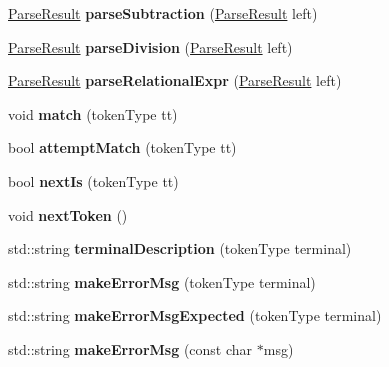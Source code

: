 \begin{DoxyCompactItemize}
\item 
\hypertarget{classParser_ac22cf1f77e0ca4c23942d5cbcc47eb37}{\hyperlink{classParseResult}{Parse\-Result} {\bfseries parse\-Subtraction} (\hyperlink{classParseResult}{Parse\-Result} left)}\label{classParser_ac22cf1f77e0ca4c23942d5cbcc47eb37}

\item 
\hypertarget{classParser_ad05e6cd1bf83179ecb727b83cbbd0c4e}{\hyperlink{classParseResult}{Parse\-Result} {\bfseries parse\-Division} (\hyperlink{classParseResult}{Parse\-Result} left)}\label{classParser_ad05e6cd1bf83179ecb727b83cbbd0c4e}

\item 
\hypertarget{classParser_ab42ecabc4dbe601d5ed9667351c0c0b8}{\hyperlink{classParseResult}{Parse\-Result} {\bfseries parse\-Relational\-Expr} (\hyperlink{classParseResult}{Parse\-Result} left)}\label{classParser_ab42ecabc4dbe601d5ed9667351c0c0b8}

\item 
\hypertarget{classParser_a3199aab5275c8b6477245eb866fabf35}{void {\bfseries match} (token\-Type tt)}\label{classParser_a3199aab5275c8b6477245eb866fabf35}

\item 
\hypertarget{classParser_a151ffb920a67527813d77bc4ba44c4a7}{bool {\bfseries attempt\-Match} (token\-Type tt)}\label{classParser_a151ffb920a67527813d77bc4ba44c4a7}

\item 
\hypertarget{classParser_a67a10b685bd263477b5f59f1923cdec3}{bool {\bfseries next\-Is} (token\-Type tt)}\label{classParser_a67a10b685bd263477b5f59f1923cdec3}

\item 
\hypertarget{classParser_a324a5bb61c9dfc645300a92aecd6fe69}{void {\bfseries next\-Token} ()}\label{classParser_a324a5bb61c9dfc645300a92aecd6fe69}

\item 
\hypertarget{classParser_a1f45059a13bc0c98355278a9ca9feed9}{std\-::string {\bfseries terminal\-Description} (token\-Type terminal)}\label{classParser_a1f45059a13bc0c98355278a9ca9feed9}

\item 
\hypertarget{classParser_a341bee73e8b1e8558505a237846b16b3}{std\-::string {\bfseries make\-Error\-Msg} (token\-Type terminal)}\label{classParser_a341bee73e8b1e8558505a237846b16b3}

\item 
\hypertarget{classParser_ad38e58ddee85db2aecbd3c7bdcf42116}{std\-::string {\bfseries make\-Error\-Msg\-Expected} (token\-Type terminal)}\label{classParser_ad38e58ddee85db2aecbd3c7bdcf42116}

\item 
\hypertarget{classParser_a60c23daeffb7ced92599e4f2555f71c9}{std\-::string {\bfseries make\-Error\-Msg} (const char $\ast$msg)}\label{classParser_a60c23daeffb7ced92599e4f2555f71c9}

\end{DoxyCompactItemize}
